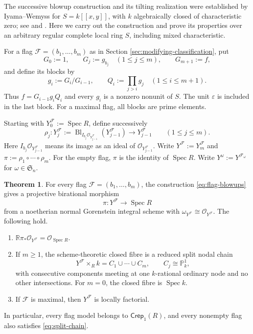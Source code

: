 \documentclass[a4paper,reqno]{amsart}
\def\F{\mathcal{F}}
\def\O{\mathcal{O}}
\DeclareMathOperator{\Spec}{Spec}
\theoremstyle{definition}
\newtheorem{Thm}{Theorem}[section]
\begin{document}
The successive blowup construction and its tilting realization were established by Iyama--Wemyss for $S=k[[x,y]]$, with $k$ algebraically closed of characteristic zero; see \cite[Section 5.1 and Theorem 5.2]{IW14} and \cite[Section 5.5 and Theorem 5.35]{IW18}. Here we carry out the construction and prove its properties over an arbitrary regular complete local ring $S$, including mixed characteristic.

For a flag $\F=(b_1,\ldots,b_m)$ as in Section \ref{sec:modifying-classification}, put
\[
G_0:=1,\qquad G_j:=g_{b_j}\quad(1\le j\le m),\qquad G_{m+1}:=f,
\]
and define its blocks by
\begin{equation}\label{eq:flag-blocks}
g_i:=G_i/G_{i-1},\qquad Q_i:=\prod_{j>i}g_j
\quad(1\le i\le m+1).
\end{equation}
Thus $f=G_{i-1}g_iQ_i$ and every $g_i$ is a nonzero nonunit of $S$. The unit $\varepsilon$ is included in the last block. For a maximal flag, all blocks are prime elements.

Starting with $Y_0^\F:=\Spec R$, define successively
\begin{equation}\label{eq:flag-blowups}
\rho_j\colon Y_j^\F
:=\operatorname{Bl}_{I_{b_j}\O_{Y_{j-1}^\F}}(Y_{j-1}^\F)
\longrightarrow Y_{j-1}^\F
\qquad(1\le j\le m).
\end{equation}
Here $I_{b_j}\O_{Y_{j-1}^\F}$ means its image as an ideal of $\O_{Y_{j-1}^\F}$. Write $Y^\F:=Y_m^\F$ and $\pi:=\rho_1\circ\cdots\circ\rho_m$. For the empty flag, $\pi$ is the identity of $\Spec R$. Write $Y^\omega:=Y^{\F_\omega}$ for $\omega\in\mathfrak S_n$.

\begin{Thm}\label{thm:flag-models}
For every flag $\F=(b_1,\ldots,b_m)$, the construction \eqref{eq:flag-blowups} gives a projective birational morphism
\[
\pi\colon Y^\F\longrightarrow\Spec R
\]
from a noetherian normal Gorenstein integral scheme with $\omega_{Y^\F}\cong\O_{Y^\F}$. The following hold.
\begin{enumerate}
\item $\mathbb R\pi_*\O_{Y^\F}=\O_{\Spec R}$.
\item If $m\ge1$, the scheme-theoretic closed fibre is a reduced split nodal chain
\[
Y^\F\times_Rk=C_1\cup\cdots\cup C_m,\qquad C_j\cong\mathbb P^1_k,
\]
with consecutive components meeting at one $k$-rational ordinary node and no other intersections. For $m=0$, the closed fibre is $\Spec k$.
\item If $\F$ is maximal, then $Y^\F$ is locally factorial.
\end{enumerate}
In particular, every flag model belongs to $\mathsf{Crep}_1(R)$, and every nonempty flag also satisfies \eqref{eq:split-chain}.
\end{Thm}
\end{document}
